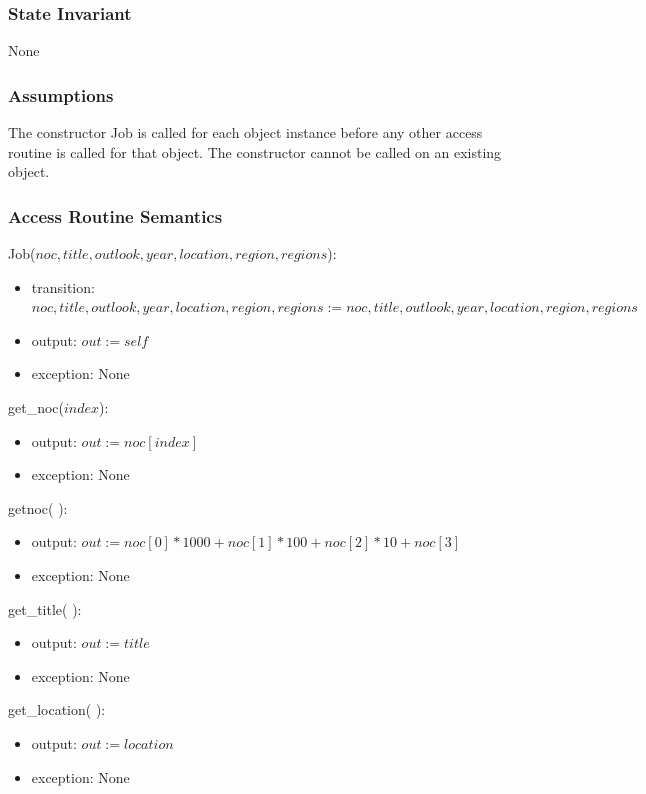 \documentclass[12pt]{article}
\begin{document}
\subsubsection* {State Invariant}

None

\subsubsection* {Assumptions}

The constructor Job is called for each object instance before any other
access routine is called for that object.  The constructor cannot be called on
an existing object.

\subsubsection* {Access Routine Semantics}

Job($noc, title, outlook, year, location, region, regions$):
\begin{itemize}
\item transition: $noc, title, outlook, year, location, region, regions := noc, title, outlook, year, location, region, regions$
\item output: $out := \mathit{self}$
\item exception: None
\end{itemize}

\noindent get\_noc($index$):
\begin{itemize}
\item output: $out := noc[index]$
\item exception: None
\end{itemize}

\noindent getnoc( ):
\begin{itemize}
\item output: $out := noc[0]*1000+noc[1]*100+noc[2]*10+noc[3]$
\item exception: None
\end{itemize}

\noindent get\_title( ):
\begin{itemize}
\item output: $out := title$
\item exception: None
\end{itemize}

\noindent get\_location( ):
\begin{itemize}
\item output: $out := location$
\item exception: None
\end{itemize}
\end{document}
